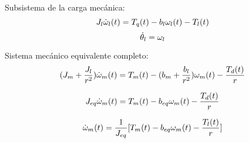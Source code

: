 \documentclass{article}
\begin{document}
Subsistema de la carga mecánica:
\begin{equation}
    \label{eq:3.1}
    J_{l}\dot{\omega}_{l}(t) = T_{q}(t)-b_{l}\omega_{l}(t)-T_{l}(t) \\
\end{equation}
\begin{equation}
    \label{eq:3.2}
    \dot{\theta}_{l} = \omega_{l}\\
\end{equation}

Sistema mecánico equivalente completo:
\begin{equation}
    \label{eq:4.1}
    (J_{m}+\frac{J_{l}}{r^2})\dot{\omega}_{m}(t) = T_{m}(t)-(b_{m}+\frac{b_{l}}{r^2})\omega_{m}(t)-\frac{T_{d}(t)}{r} \\
\end{equation}

\begin{equation}
    J_{eq}\dot{\omega}_{m}(t) = T_{m}(t)-b_{eq}\omega_{m}(t)-\frac{T_{d}(t)}{r} \\
\end{equation}

\begin{equation}
    \dot{\omega}_{m}(t) = \frac{1}{J_{eq}}[T_{m}(t) - b_{eq}\omega_{m}(t) - \frac{T_{l}(t)}{r}]\\
\end{equation}
\end{document}
